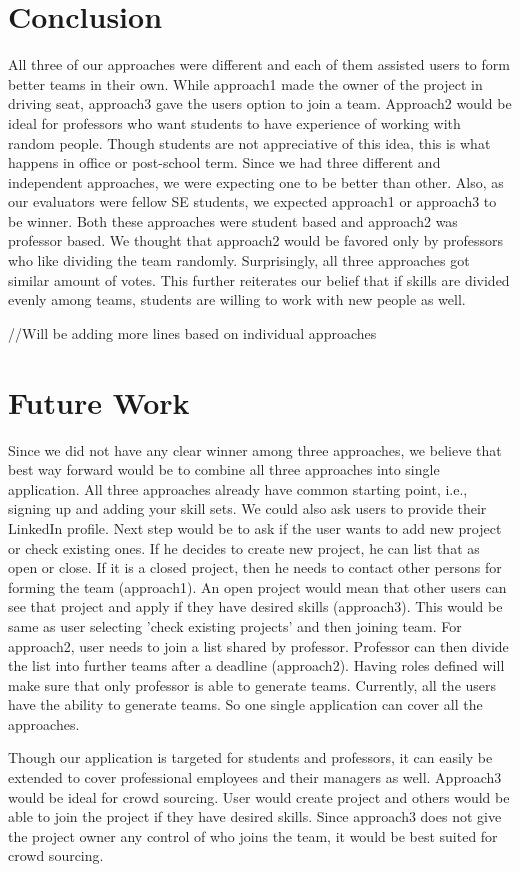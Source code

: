 \documentclass[conference]{IEEEtran}
\begin{document}
\section{Conclusion}
All three of our approaches were different and each of them assisted users to form better teams in their own. While approach1 made the owner of the project in driving seat, approach3 gave the users option to join a team. Approach2 would be ideal for professors who want students to have experience of working with random people. Though students are not appreciative of this idea, this is what happens in office or post-school term. Since we had three different and independent approaches, we were expecting one to be better than other. Also, as our evaluators were fellow SE students, we expected approach1 or approach3 to be winner. Both these approaches were student based and approach2 was professor based. We thought that approach2 would be favored only by professors who like dividing the team randomly. Surprisingly, all three approaches got similar amount of votes. This further reiterates our belief that if skills are divided evenly among teams, students are willing to work with new people as well.

//Will be adding more lines based on individual approaches 

\section{Future Work}
Since we did not have any clear winner among three approaches, we believe that best way forward would be to combine all three approaches into single application. All three approaches already have common starting point, i.e., signing up and adding your skill sets. We could also ask users to provide their LinkedIn profile. Next step would be to ask if the user wants to add new project or check existing ones. If he decides to create new project, he can list that as open or close. If it is a closed project, then he needs to contact other persons for forming the team (approach1). An open project would mean that other users can see that project and apply if they have desired skills (approach3). This would be same as user selecting 'check existing projects' and then joining team. For approach2, user needs to join a list shared by professor. Professor can then divide the list into further teams after a deadline (approach2). Having roles defined will make sure that only professor is able to generate teams. Currently, all the users have the ability to generate teams. So one single application can cover all the approaches.  

Though our application is targeted for students and professors, it can easily be extended to cover professional employees and their managers as well. Approach3 would be ideal for crowd sourcing. User would create project and others would be able to join the project if they have desired skills. Since approach3 does not give the project owner any control of who joins the team, it would be best suited for crowd sourcing. 
\end{document}
